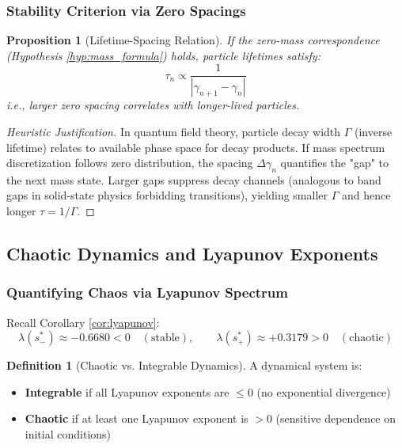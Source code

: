 \documentclass[12pt]{article}
\theoremstyle{plain}
\newtheorem{proposition}[theorem]{Proposition}
\theoremstyle{definition}
\newtheorem{definition}[theorem]{Definition}
\begin{document}
\subsubsection{Stability Criterion via Zero Spacings}

\begin{proposition}[Lifetime-Spacing Relation]\label{prop:lifetime}
If the zero-mass correspondence (Hypothesis \ref{hyp:mass_formula}) holds, particle lifetimes satisfy:
\begin{equation}
\tau_n \propto \frac{1}{|\gamma_{n+1} - \gamma_n|}
\end{equation}
i.e., larger zero spacing correlates with longer-lived particles.
\end{proposition}

\begin{proof}[Heuristic Justification]
In quantum field theory, particle decay width $\Gamma$ (inverse lifetime) relates to available phase space for decay products. If mass spectrum discretization follows zero distribution, the spacing $\Delta \gamma_n$ quantifies the "gap" to the next mass state. Larger gaps suppress decay channels (analogous to band gaps in solid-state physics forbidding transitions), yielding smaller $\Gamma$ and hence longer $\tau = 1/\Gamma$.
\end{proof}

\subsection{Chaotic Dynamics and Lyapunov Exponents}

\subsubsection{Quantifying Chaos via Lyapunov Spectrum}

Recall Corollary \ref{cor:lyapunov}:
$$\lambda(s_-^*) \approx -0.6680 < 0 \quad (\text{stable}), \qquad \lambda(s_+^*) \approx +0.3179 > 0 \quad (\text{chaotic})$$

\begin{definition}[Chaotic vs. Integrable Dynamics]
A dynamical system is:
\begin{itemize}
\item \textbf{Integrable} if all Lyapunov exponents are $\leq 0$ (no exponential divergence)
\item \textbf{Chaotic} if at least one Lyapunov exponent is $> 0$ (sensitive dependence on initial conditions)
\end{itemize}
\end{definition}
\end{document}
